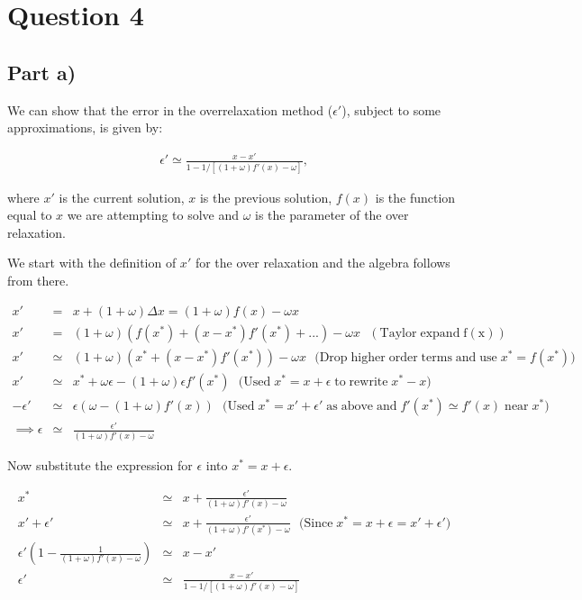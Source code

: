 \documentclass[a4paper,12pt]{article}
\begin{document}
\section{Question 4}

\subsection{Part a)}

We can show that the error in the overrelaxation method ($\epsilon '$), subject to some approximations, is given by:

\begin{eqnarray}
\epsilon'\simeq \frac{x-x'}{1 - 1/[(1+\omega)f'(x)-\omega]},\label{eqn:eps}
\end{eqnarray}

where $x'$ is the current solution, $x$ is the previous solution, $f(x)$ is the function equal to $x$ we are attempting to solve and $\omega$ is the parameter of the over relaxation.

We start with the definition of $x'$ for the over relaxation and the algebra follows from there.

\begin{eqnarray}
x' &=& x + (1+\omega)\Delta x = (1+\omega)f(x) - \omega x\nonumber\\
x' &=& (1+\omega)(f(x^*) + (x-x^*)f'(x^*) + ...) - \omega x \mathrm{\:\:\:(Taylor\;expand\;f(x))}\nonumber\\
x' &\simeq & (1+\omega)(x^* + (x-x^*)f'(x^*)) - \omega x \mathrm{\:\:\:(Drop\; higher\;order\;terms\;and\;use\;}x^* = f(x^*)\mathrm{)}\nonumber\\
x' &\simeq & x^* + \omega \epsilon - (1+\omega)\epsilon f'(x^*) \mathrm{\:\:\:(Used\;} x^* = x + \epsilon\mathrm{\;to\; rewrite\;} x^*-x)\nonumber\\
-\epsilon' &\simeq& \epsilon (\omega - (1+\omega)f'(x))\mathrm{\:\:\:(Used\;} x^* = x' + \epsilon' \mathrm{\; as\; above\; and\;} f'(x^*)\simeq f'(x)\mathrm{\; near\;} x^*)\nonumber\\
\implies \epsilon &\simeq& \frac{\epsilon'}{(1+\omega)f'(x) - \omega}\nonumber
\end{eqnarray}

Now substitute the expression for $\epsilon$ into $x^* = x + \epsilon$.

\begin{eqnarray}
x^* &\simeq& x + \frac{\epsilon'}{(1+\omega)f'(x) - \omega}\nonumber\\
x' + \epsilon' &\simeq& x + \frac{\epsilon'}{(1+\omega)f'(x^*)-\omega} \mathrm{\:\:\:(Since\;} x^* = x + \epsilon = x' + \epsilon')\nonumber\\
\epsilon'\left(1 - \frac{1}{(1+\omega)f'(x) - \omega}\right) &\simeq& x - x'\nonumber\\
\epsilon' &\simeq& \frac{x-x'}{1-1/[(1+\omega)f'(x) - \omega]}\nonumber 
\end{eqnarray}
\end{document}
